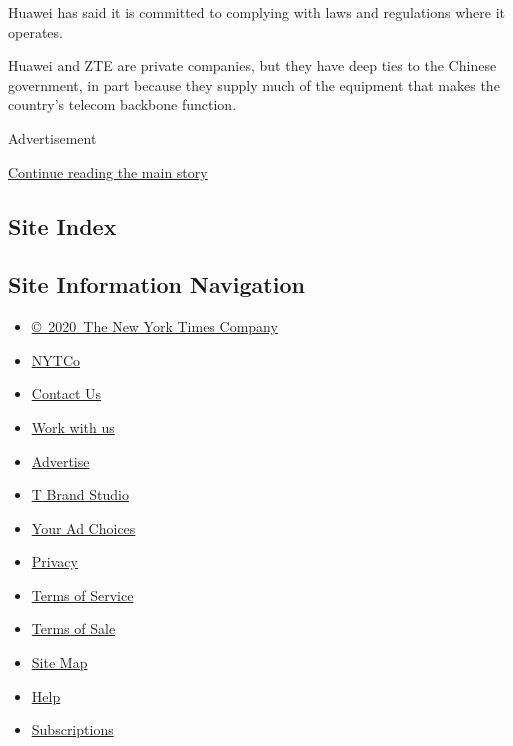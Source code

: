 Huawei has said it is committed to complying with laws and regulations
where it operates.

Huawei and ZTE are private companies, but they have deep ties to the
Chinese government, in part because they supply much of the equipment
that makes the country's telecom backbone function.

Advertisement

\protect\hyperlink{after-bottom}{Continue reading the main story}

\hypertarget{site-index}{%
\subsection{Site Index}\label{site-index}}

\hypertarget{site-information-navigation}{%
\subsection{Site Information
Navigation}\label{site-information-navigation}}

\begin{itemize}
\tightlist
\item
  \href{https://help.nytimes.com/hc/en-us/articles/115014792127-Copyright-notice}{©~2020~The
  New York Times Company}
\end{itemize}

\begin{itemize}
\tightlist
\item
  \href{https://www.nytco.com/}{NYTCo}
\item
  \href{https://help.nytimes.com/hc/en-us/articles/115015385887-Contact-Us}{Contact
  Us}
\item
  \href{https://www.nytco.com/careers/}{Work with us}
\item
  \href{https://nytmediakit.com/}{Advertise}
\item
  \href{http://www.tbrandstudio.com/}{T Brand Studio}
\item
  \href{https://www.nytimes.com/privacy/cookie-policy\#how-do-i-manage-trackers}{Your
  Ad Choices}
\item
  \href{https://www.nytimes.com/privacy}{Privacy}
\item
  \href{https://help.nytimes.com/hc/en-us/articles/115014893428-Terms-of-service}{Terms
  of Service}
\item
  \href{https://help.nytimes.com/hc/en-us/articles/115014893968-Terms-of-sale}{Terms
  of Sale}
\item
  \href{https://spiderbites.nytimes.com}{Site Map}
\item
  \href{https://help.nytimes.com/hc/en-us}{Help}
\item
  \href{https://www.nytimes.com/subscription?campaignId=37WXW}{Subscriptions}
\end{itemize}

